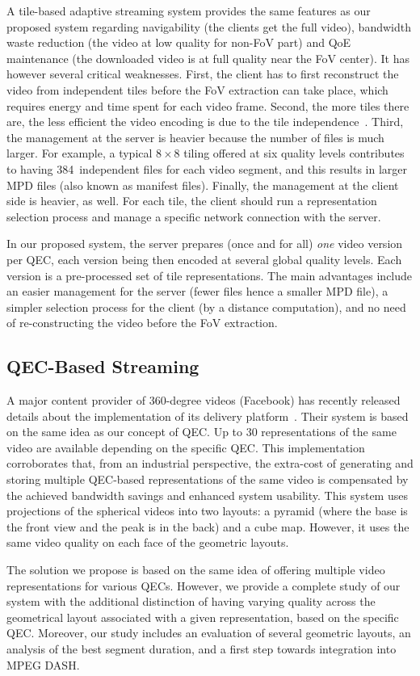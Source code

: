 A tile-based adaptive streaming
system provides the same features as our proposed system regarding navigability (the clients
get the full video), bandwidth
waste reduction (the video at low quality for non-\ac{FoV} part) and \ac{QoE} maintenance (the downloaded video is at full quality near the
FoV center). It has however several critical weaknesses. First, the client has to first reconstruct
the video from independent tiles before the FoV extraction can take place, which requires energy and
time spent for each video frame. Second, the more tiles there are, the less efficient the video encoding is due to the
tile independence~\cite{sanchez_compressed_2015}. Third, the management at the server is
heavier because the number of files
is much larger. For example, a typical $8\times8$ tiling offered at six quality levels contributes to having
384~independent files for each video segment, and this results in larger \ac{MPD} files (also known as
manifest files).
Finally, the management at the client side is heavier, as well. For each tile, the client should run
a representation selection process
and manage a specific network connection with the server.

 In our proposed system, the server prepares (once and for
all) \emph{one} video version per
\ac{QEC}, each version being then encoded at several global quality levels. Each version
is a pre-processed set of tile representations. The main advantages include an easier
management for the server
(fewer files hence a smaller \ac{MPD} file), a simpler selection process for the client (by
a distance computation), and no need of re-constructing the video before the \ac{FoV} extraction.

\subsection{QEC-Based Streaming}

A major content provider of 360-degree videos (Facebook) has recently
released details about the
implementation of its delivery platform~\cite{facebook}. Their system is based
on the same idea as our concept of \ac{QEC}. Up to 30 representations of the same video
are available depending on the specific
\ac{QEC}. This implementation corroborates that, from an industrial perspective, the
extra-cost of
generating and storing multiple \ac{QEC}-based representations of the same video
is compensated by the achieved bandwidth
savings and enhanced system usability. This system uses projections of the spherical videos into two layouts: a pyramid (where the
base is the front
view and the peak is in the back) and a cube map. However, it uses the same video quality
on each face of the geometric layouts.

The
solution we propose is based on the same idea of offering multiple video representations
for various \acp{QEC}.
However, we provide a complete study of
our system with the additional distinction of having varying quality across the geometrical layout associated with a given representation, based on the specific \ac{QEC}.
Moreover, our
study includes an evaluation of several geometric layouts, an analysis of the best segment
duration, and a first step towards integration into MPEG \ac{DASH}.
